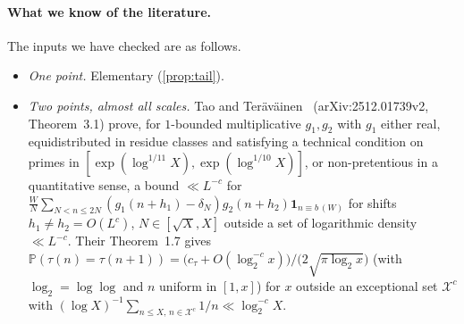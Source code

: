 \documentclass[11pt]{article}
\renewcommand{\Pr}{\mathbb P}
\newcommand{\ind}{\mathbf 1}
\begin{document}
\paragraph{What we know of the literature.} The inputs we have checked are as follows.
\begin{itemize}[leftmargin=1.5em]
\item \emph{One point.} Elementary (\cref{prop:tail}).
\item \emph{Two points, almost all scales.} Tao and Ter\"av\"ainen~\cite{tt2025} (arXiv:2512.01739v2, Theorem~3.1) prove, for $1$-bounded multiplicative $g_1,g_2$ with $g_1$ either real, equidistributed in residue classes and satisfying a technical condition on primes in $[\exp(\log^{1/11}X),\exp(\log^{1/10}X)]$, or non-pretentious in a quantitative sense, a bound $\ll L^{-c}$ for $\frac WN\sum_{N<n\le2N}(g_1(n+h_1)-\delta_N)g_2(n+h_2)\ind_{n\equiv b\,(W)}$ for shifts $h_1\ne h_2=O(L^c)$, $N\in[\sqrt X,X]$ outside a set of logarithmic density $\ll L^{-c}$. Their Theorem~1.7 gives $\Pr(\tau(n)=\tau(n+1))=\bigl(c_\tau+O(\log_2^{-c}x)\bigr)/\bigl(2\sqrt{\pi\log_2x}\bigr)$ (with $\log_2=\log\log$ and $n$ uniform in $[1,x]$) for $x$ outside an exceptional set $\mathcal X^c$ with $(\log X)^{-1}\sum_{n\le X,\,n\in\mathcal X^c}1/n\ll\log_2^{-c}X$.


\end{itemize}
\end{document}

